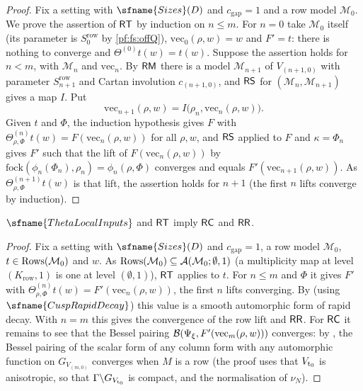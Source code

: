 \begin{proof}
Fix a setting with $\sfname{Sizes}(D)$ and $c_{\mathrm{gap}}=1$ and a row model $\mathcal M_0$. We prove the assertion of $\mathsf{RT}$ by
induction on $n\le m$. For $n=0$ take $\mathcal M_0$ itself (its parameter is $S^{\mathrm{row}}_0$ by \cref{pf:fs:offQ}),
$\mathrm{vec}_0(\rho,w)=w$ and $F'=t$: there is nothing to converge and $\Theta^{(0)}t(w)=t(w)$. Suppose the assertion holds for $n<m$,
with $\mathcal M_n$ and $\mathrm{vec}_n$. By $\mathsf{RM}$ there is a model $\mathcal M_{n+1}$ of $V_{(n+1,0)}$ with parameter
$S^{\mathrm{row}}_{n+1}$ and Cartan involution $c_{(n+1,0)}$, and $\mathsf{RS}$ for $(\mathcal M_n,\mathcal M_{n+1})$ gives a map $I$. Put
\[
\mathrm{vec}_{n+1}(\rho,w)=I\bigl(\rho_n,\mathrm{vec}_n(\rho,w)\bigr).
\]
Given $t$ and $\Phi$, the induction hypothesis gives $F$ with $\Theta^{(n)}_{\rho,\Phi}t(w)=F(\mathrm{vec}_n(\rho,w))$ for all $\rho,w$, and
$\mathsf{RS}$ applied to $F$ and $\kappa=\Phi_n$ gives $F'$ such that the lift of $F(\mathrm{vec}_n(\rho,w))$ by
$\mathrm{fock}(\phi_n(\Phi_n),\rho_n)=\phi_n(\rho,\Phi)$ converges and equals $F'(\mathrm{vec}_{n+1}(\rho,w))$. As
$\Theta^{(n+1)}_{\rho,\Phi}t(w)$ is that lift, the assertion holds for $n+1$ (the first $n$ lifts converge by induction).
\end{proof}

\begin{proposition}\label{pf:fs:conv}
$\sfname{ThetaLocalInputs}$ and $\mathsf{RT}$ imply $\mathsf{RC}$ and $\mathsf{RR}$.
\end{proposition}

\begin{proof}
Fix a setting with $\sfname{Sizes}(D)$ and $c_{\mathrm{gap}}=1$, a row model $\mathcal M_0$, $t\in\mathrm{Rows}(\mathcal M_0)$ and $w$. As
$\mathrm{Rows}(\mathcal M_0)\subseteq\mathcal A(\mathcal M_0;\emptyset,1)$ (a multiplicity map at level $(K_{\mathrm{row}},1)$ is one at level
$(\emptyset,1)$), $\mathsf{RT}$ applies to $t$. For $n\le m$ and $\Phi$ it gives $F'$ with
$\Theta^{(n)}_{\rho,\Phi}t(w)=F'(\mathrm{vec}_n(\rho,w))$, the first $n$ lifts converging. By
 (using $\sfname{CuspRapidDecay}$) this value is a smooth automorphic
form of rapid decay. With $n=m$ this gives the convergence of the row lift and $\mathsf{RR}$. For $\mathsf{RC}$ it remains to see that the
Bessel pairing $\mathcal B(\Psi_\xi,F'(\mathrm{vec}_m(\rho,w)))$ converges: by , the Bessel
pairing of the scalar form of any column form with any automorphic function on $G_{V_{(m,0)}}$ converges when $M$ is a row (the
proof uses that $V_{\mathrm{t}_0}$ is anisotropic, so that $\Gamma\backslash G_{V_{\mathrm{t}_0}}$ is compact, and the normalisation of
$\nu_N$).
\end{proof}

